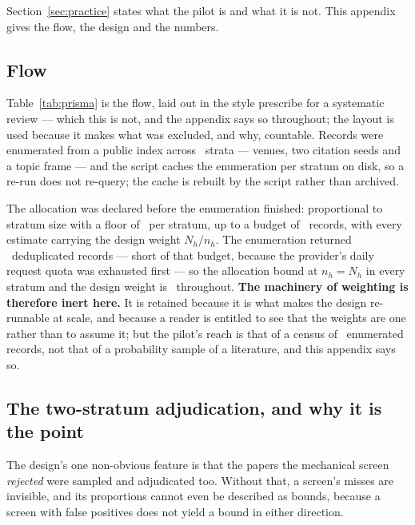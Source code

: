 
Section~\ref{sec:practice} states what the pilot is and what it is not. This
appendix gives the flow, the design and the numbers.

\subsection*{Flow}



Table~\ref{tab:prisma} is the flow, laid out in the style
\citet{page2021prisma} prescribe for a systematic review --- which this is
not, and the appendix says so throughout; the layout is used because it makes
what was excluded, and why, countable. Records were enumerated from
a public index across \nAuditStrata\ strata --- venues, two citation seeds and
a topic frame --- and the script caches the enumeration per stratum on disk,
so a re-run does not re-query; the cache is rebuilt by the script rather than
archived.

The allocation was declared before the enumeration finished: proportional to
stratum size with a floor of \minPerStratum\ per stratum, up to a budget of
\nAuditTarget\ records, with every estimate carrying the design weight
$N_h / n_h$. The enumeration returned \nAuditFrame\ deduplicated records ---
short of that budget, because the provider's daily request quota was exhausted
first --- so the allocation bound at $n_h = N_h$ in every stratum and the
design weight is \auditMaxWeight\ throughout. \textbf{The machinery of
weighting is therefore inert here.} It is retained because it is what makes
the design re-runnable at scale, and because a reader is entitled to see that
the weights are one rather than to assume it; but the pilot's reach is that of
a census of \nAuditFrame\ enumerated records, not that of a probability sample
of a literature, and this appendix says so.

\subsection*{The two-stratum adjudication, and why it is the point}



The design's one non-obvious feature is that the papers the mechanical screen
\emph{rejected} were sampled and adjudicated too. Without that, a screen's
misses are invisible, and its proportions cannot even be described as bounds,
because a screen with false positives does not yield a bound in either
direction.


